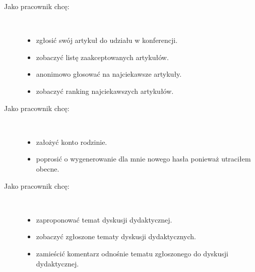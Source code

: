 \begin{description}
  \item[Jako pracownik chcę:] \hfill \\
  \begin{itemize}
    \item zgłosić swój artykuł do udziału w konferencji. \\
    \item zobaczyć listę zaakceptowanych artykułów.\\
    \item anonimowo głosować na najciekawsze artykuły.\\
    \item zobaczyć ranking najciekawszych artykułów.\\
  \end{itemize}

  \item[Jako pracownik chcę:] \hfill \\
  \begin{itemize}
    \item założyć konto rodzinie. \\
    \item poprosić o wygenerowanie dla mnie nowego hasła ponieważ utraciłem obecne.\\
  \end{itemize}

  \item[Jako pracownik chcę:] \hfill \\
  \begin{itemize}
    \item zaproponować temat dyskusji dydaktycznej.\\
    \item zobaczyć zgłoszone tematy dyskusji dydaktycznych.\\
    \item zamieścić komentarz odnośnie tematu zgłoszonego do dyskusji dydaktycznej.\\
  \end{itemize}


\end{description}
